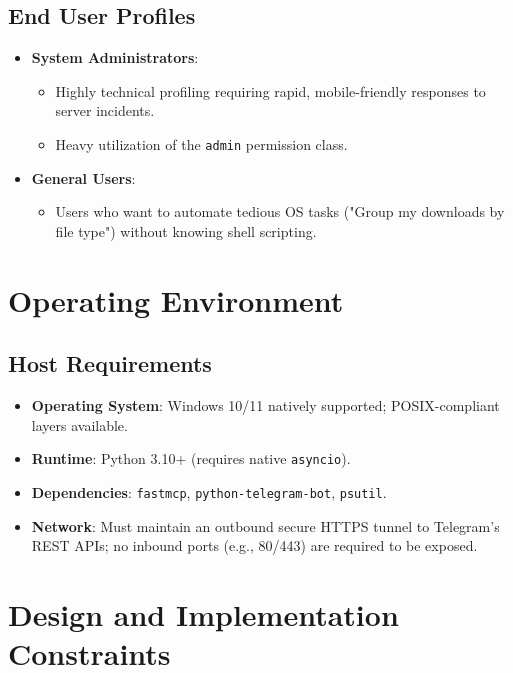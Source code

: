\documentclass{scrreprt}
\begin{document}
\subsection{End User Profiles}
\begin{itemize}
    \item \textbf{System Administrators}:
    \begin{itemize}
        \item Highly technical profiling requiring rapid, mobile-friendly responses to server incidents.
        \item Heavy utilization of the \texttt{admin} permission class.
    \end{itemize}
    
    \item \textbf{General Users}:
    \begin{itemize}
        \item Users who want to automate tedious OS tasks ("Group my downloads by file type") without knowing shell scripting.
    \end{itemize}
\end{itemize}

\section{Operating Environment}
\label{sec:operating-environment}

\subsection{Host Requirements}
\begin{itemize}
    \item \textbf{Operating System}: Windows 10/11 natively supported; POSIX-compliant layers available.
    \item \textbf{Runtime}: Python 3.10+ (requires native \texttt{asyncio}).
    \item \textbf{Dependencies}: \texttt{fastmcp}, \texttt{python-telegram-bot}, \texttt{psutil}.
    \item \textbf{Network}: Must maintain an outbound secure HTTPS tunnel to Telegram's REST APIs; no inbound ports (e.g., 80/443) are required to be exposed.
\end{itemize}

\section{Design and Implementation Constraints}
\label{sec:design-constraints}
\end{document}
